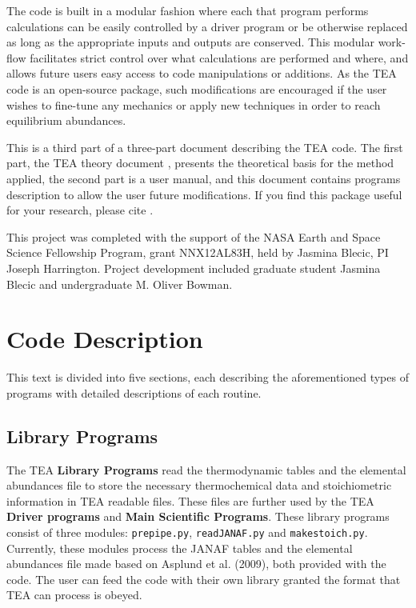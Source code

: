   The code is built in a modular fashion where each that program
  performs calculations can be easily controlled by a driver program
  or be otherwise replaced as long as the appropriate inputs and
  outputs are conserved.  This modular work-flow facilitates strict
  control over what calculations are performed and where, and allows
  future users easy access to code manipulations or additions.  As the
  TEA code is an open-source package, such modifications are
  encouraged if the user wishes to fine-tune any mechanics or apply
  new techniques in order to reach equilibrium abundances.
  
This is a third part of a three-part document describing the TEA
code. The first part, the TEA theory
document \citep{BlecicEtal2016-TEAtheory}, presents the theoretical
basis for the method applied, the second part is a user manual, and
this document contains programs description to allow the user future
modifications. If you find this package useful for your research,
please cite \citet{BlecicEtal2016-TEAtheory}.


  This project was completed with the support of the NASA Earth and
  Space Science Fellowship Program, grant NNX12AL83H, held by Jasmina
  Blecic, PI Joseph Harrington. Project development included graduate
  student Jasmina Blecic and undergraduate M. Oliver Bowman.



\section{Code Description}

This text is divided into five sections, each describing the
aforementioned types of programs with detailed descriptions of each
routine.

\subsection{Library Programs}
\label{PrepipeSec}

The TEA {\bf Library Programs} read the thermodynamic tables and the
elemental abundances file to store the necessary thermochemical data
and stoichiometric information in TEA readable files. These files are
further used by the TEA {\bf Driver programs} and {\bf Main Scientific
Programs}. These library programs consist of three
modules: \texttt{prepipe.py}, \texttt{readJANAF.py}
and \newline \texttt{makestoich.py}. Currently, these modules process
the JANAF tables and the elemental abundances file made based on
Asplund et al. (2009), both provided with the code. The user can feed
the code with their own library granted the format that TEA can
process is obeyed.

